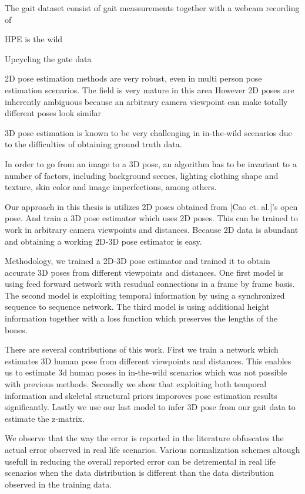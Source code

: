 The gait dataset consist of gait meassurements together with a webcam recording of

HPE is the wild

Upcycling the gate data

2D pose estimation methods are very robust, even in multi person pose estimation scenarios.
The field is very mature in this area
However 2D poses are inherently ambiguous because an arbitrary
camera viewpoint can make totally different poses look similar

3D pose estimation is known to be very challenging in in-the-wild scenarios due to the difficulties 
of obtaining ground truth data. 

In order to go from an image to a 3D pose, an algorithm has to be invariant to a number of factors, including background scenes, lighting clothing shape and texture, skin color and image imperfections, among others. 

Our approach in this thesis is utilizes 2D poses obtained from [Cao et. al.]'s open pose. 
And train a 3D pose estimator which uses 2D poses.
This can be trained to work in arbitrary camera viewpoints and distances. 
Because 2D data is abundant and obtaining a working 2D-3D pose estimator is easy.

Methodology, we trained a 2D-3D pose estimator and trained it to obtain accurate 3D poses
from different viewpoints and distances. One first model is using feed forward network with 
resudual connections in a frame by frame basis. The second model is exploiting temporal information
by using a synchronized sequence to sequence network. The third model is using additional height 
information together with a loss function which preserves the lengths of the bones.

There are several contributions of this work. First we train a network which estimates 3D human pose
from different viewpoints and distances. This enables us to estimate 3d human poses in in-the-wild 
scenarios which was not possible with previous methods. Secondly we show that exploiting both 
temporal information and skeletal structural priors imporoves pose estimation results significantly. 
Lastly we use our last model to infer 3D pose from our gait data to estimate the z-matrix.

We observe that the way the error is reported in the literature obfuscates the actual error observed in real life scenarios.
Various normalization schemes altough usefull in reducing the overall reported error can be detremental in real life scenarios 
when the data distribution is different than the data distribution observed in the training data.

